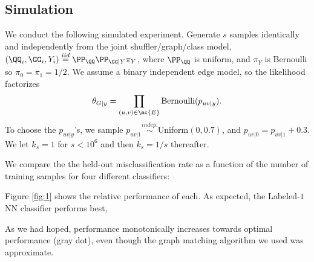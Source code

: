 



% 


\subsection{Simulation} %
\label{sub:classifiers}


We conduct the following simulated experiment. Generate $s$ samples identically and independently from the joint shuffler/graph/class model, $(\QQ_i,\GG_i,Y_i)\overset{iid}{=}\PP_{\QQ}\PP_{\GG|Y} \pi_Y$, where $\PP_{\QQ}$ is uniform, and $\pi_Y$ is Bernoulli so $\pi_0=\pi_1=1/2$.  We assume a binary independent edge model, so the likelihood factorizes
\begin{align}
	\theta_{G|y} = \prod_{(u,v) \in \mc{E}} \text{Bernoulli}(p_{uv|y}).
\end{align}
To choose the $p_{uv|y}$'s, we sample $p_{uv|1} \overset{indep.}{\sim}$Uniform$(0,0.7)$, and $p_{uv|0}=p_{uv|1}+0.3$.  We let $k_s=1$ for $s<10^6$ and then $k_s=1/s$ thereafter.

We compare the the held-out misclassification rate as a function of the number of training samples for four different classifiers:


Figure \ref{fig:1} shows the relative performance of each.  As expected, the Labeled-$1$NN classifier performs best, 

As we had hoped, performance monotonically increases towards optimal performance (gray dot), even though the graph matching algorithm we used was approximate.

